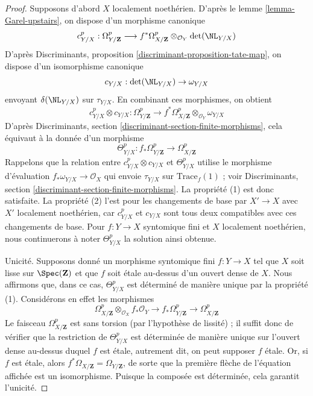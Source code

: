 \begin{proof}
Supposons d'abord $X$ localement noethérien. D'après
le lemme \ref{lemma-Garel-upstairs}, on dispose d'un morphisme canonique
$$
c^p_{Y/X} : \Omega_{Y/\mathbf{Z}}^p
\longrightarrow
f^*\Omega_{X/\mathbf{Z}}^p \otimes_{\mathcal{O}_Y} \det(\NL_{Y/X})
$$
D'après Discriminants, proposition \ref{discriminant-proposition-tate-map},
on dispose d'un isomorphisme canonique
$$
c_{Y/X} : \det(\NL_{Y/X}) \to \omega_{Y/X}
$$
envoyant $\delta(\NL_{Y/X})$ sur $\tau_{Y/X}$. En combinant ces morphismes, on obtient
$$
c^p_{Y/X} \otimes c_{Y/X} :
\Omega_{Y/\mathbf{Z}}^p
\longrightarrow
f^*\Omega_{X/\mathbf{Z}}^p \otimes_{\mathcal{O}_Y} \omega_{Y/X}
$$
D'après Discriminants, section \ref{discriminant-section-finite-morphisms},
cela équivaut à la donnée d'un morphisme
$$
\Theta_{Y/X}^p :
f_*\Omega_{Y/\mathbf{Z}}^p
\longrightarrow
\Omega_{X/\mathbf{Z}}^p
$$
Rappelons que la relation entre $c^p_{Y/X} \otimes c_{Y/X}$
et $\Theta_{Y/X}^p$ utilise le morphisme d'évaluation
$f_*\omega_{Y/X} \to \mathcal{O}_X$
qui envoie $\tau_{Y/X}$ sur $\text{Trace}_f(1)$ ; voir
Discriminants, section \ref{discriminant-section-finite-morphisms}.
La propriété (1) est donc satisfaite. La propriété (2) l'est pour les changements de base par
$X' \to X$ avec $X'$ localement noethérien, car $c^p_{Y/X}$ et
$c_{Y/X}$ sont tous deux compatibles avec ces changements de base. Pour $f : Y \to X$
syntomique fini et $X$ localement noethérien,
nous continuerons à noter $\Theta^p_{Y/X}$ la solution ainsi obtenue.

\medskip\noindent
Unicité. Supposons donné un morphisme syntomique fini
$f: Y \to X$ tel que $X$ soit lisse sur $\Spec(\mathbf{Z})$
et que $f$ soit étale au-dessus d'un ouvert dense de $X$. Nous affirmons que,
dans ce cas, $\Theta^p_{Y/X}$ est déterminé de manière unique par la propriété (1).
Considérons en effet les morphismes
$$
\Omega^p_{X/\mathbf{Z}} \otimes_{\mathcal{O}_X} f_*\mathcal{O}_Y \to
f_*\Omega^p_{Y/\mathbf{Z}} \to
\Omega^p_{X/\mathbf{Z}}
$$
Le faisceau $\Omega^p_{X/\mathbf{Z}}$ est sans torsion (par l'hypothèse de
lissité) ; il suffit donc de vérifier que la restriction de
$\Theta^p_{Y/X}$ est déterminée de manière unique sur l'ouvert dense au-dessus
duquel $f$ est étale, autrement dit, on peut supposer $f$ étale.
Or, si $f$ est étale, alors
$f^*\Omega_{X/\mathbf{Z}} = \Omega_{Y/\mathbf{Z}}$,
de sorte que la première flèche de l'équation affichée est un isomorphisme.
Puisque la composée est déterminée, cela garantit l'unicité.


\end{proof}
